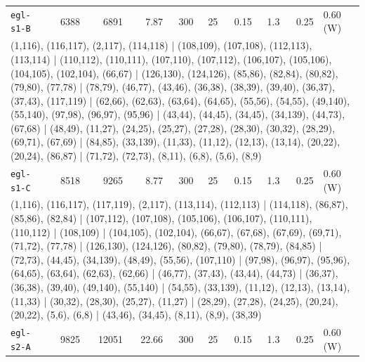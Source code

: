 \begin{longtable}{lrrrrrrrrl}
\texttt{egl-s1-B} & 6388 & 6891 & 7.87 & 300 & 25 & 0.15 & 1.3 & 0.25 & 0.60\,(W) \\
\multicolumn{10}{p{0.96\linewidth}}{\tiny\raggedright\arraybackslash (1,116), (116,117), (2,117), (114,118) | (108,109), (107,108), (112,113), (113,114) | (110,112), (110,111), (107,110), (107,112), (106,107), (105,106), (104,105), (102,104), (66,67) | (126,130), (124,126), (85,86), (82,84), (80,82), (79,80), (77,78) | (78,79), (46,77), (43,46), (36,38), (38,39), (39,40), (36,37), (37,43), (117,119) | (62,66), (62,63), (63,64), (64,65), (55,56), (54,55), (49,140), (55,140), (97,98), (96,97), (95,96) | (43,44), (44,45), (34,45), (34,139), (44,73), (67,68) | (48,49), (11,27), (24,25), (25,27), (27,28), (28,30), (30,32), (28,29), (69,71), (67,69) | (84,85), (33,139), (11,33), (11,12), (12,13), (13,14), (20,22), (20,24), (86,87) | (71,72), (72,73), (8,11), (6,8), (5,6), (8,9)} \\[2pt]
\texttt{egl-s1-C} & 8518 & 9265 & 8.77 & 300 & 25 & 0.15 & 1.3 & 0.25 & 0.60\,(W) \\
\multicolumn{10}{p{0.96\linewidth}}{\tiny\raggedright\arraybackslash (1,116), (116,117), (117,119), (2,117), (113,114), (112,113) | (114,118), (86,87), (85,86), (82,84) | (107,112), (107,108), (105,106), (106,107), (110,111), (110,112) | (108,109) | (104,105), (102,104), (66,67), (67,68), (67,69), (69,71), (71,72), (77,78) | (126,130), (124,126), (80,82), (79,80), (78,79), (84,85) | (72,73), (44,45), (34,139), (48,49), (55,56), (107,110) | (97,98), (96,97), (95,96), (64,65), (63,64), (62,63), (62,66) | (46,77), (37,43), (43,44), (44,73) | (36,37), (36,38), (39,40), (49,140), (55,140) | (54,55), (33,139), (11,12), (12,13), (13,14), (11,33) | (30,32), (28,30), (25,27), (11,27) | (28,29), (27,28), (24,25), (20,24), (20,22), (5,6), (6,8) | (43,46), (34,45), (8,11), (8,9), (38,39)} \\[2pt]
\texttt{egl-s2-A} & 9825 & 12051 & 22.66 & 300 & 25 & 0.15 & 1.3 & 0.25 & 0.60\,(W) \\

\end{longtable}
